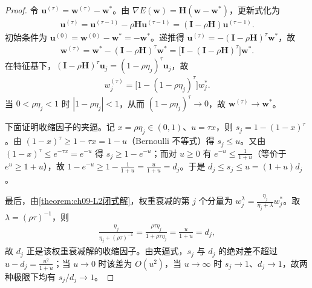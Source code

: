 \documentclass[../../main.tex]{subfiles}
\begin{document}
\begin{proof}
令 $\boldsymbol{u}^{(\tau)}=\boldsymbol{w}^{(\tau)}-\boldsymbol{w}^{*}$。由 $\nabla E(\boldsymbol{w})=\boldsymbol{H}(\boldsymbol{w}-\boldsymbol{w}^{*})$，更新式化为
\begin{align*}
\boldsymbol{u}^{(\tau)}=\boldsymbol{u}^{(\tau-1)}-\rho\boldsymbol{H}\boldsymbol{u}^{(\tau-1)}=(\boldsymbol{I}-\rho\boldsymbol{H})\boldsymbol{u}^{(\tau-1)}.
\end{align*}
初始条件为 $\boldsymbol{u}^{(0)}=\boldsymbol{w}^{(0)}-\boldsymbol{w}^{*}=-\boldsymbol{w}^{*}$。递推得 $\boldsymbol{u}^{(\tau)}=-(\boldsymbol{I}-\rho\boldsymbol{H})^{\tau}\boldsymbol{w}^{*}$，故
\begin{align*}
\boldsymbol{w}^{(\tau)}=\boldsymbol{w}^{*}-(\boldsymbol{I}-\rho\boldsymbol{H})^{\tau}\boldsymbol{w}^{*}=\bigl[\boldsymbol{I}-(\boldsymbol{I}-\rho\boldsymbol{H})^{\tau}\bigr]\boldsymbol{w}^{*}.
\end{align*}
在特征基下，$(\boldsymbol{I}-\rho\boldsymbol{H})^{\tau}\boldsymbol{u}_{j}=(1-\rho\eta_{j})^{\tau}\boldsymbol{u}_{j}$，故
\begin{align*}
w_{j}^{(\tau)}=\bigl[1-(1-\rho\eta_{j})^{\tau}\bigr]w_{j}^{*}.
\end{align*}
当 $0<\rho\eta_{j}<1$ 时 $|1-\rho\eta_{j}|<1$，从而 $(1-\rho\eta_{j})^{\tau}\to0$，故 $\boldsymbol{w}^{(\tau)}\to\boldsymbol{w}^{*}$。

下面证明收缩因子的夹逼。记 $x=\rho\eta_{j}\in(0,1)$、$u=\tau x$，则 $s_{j}=1-(1-x)^{\tau}$。由 $(1-x)^{\tau}\geqslant1-\tau x=1-u$（Bernoulli 不等式）得 $s_{j}\leqslant u$。又由 $(1-x)^{\tau}\leqslant e^{-\tau x}=e^{-u}$ 得 $s_{j}\geqslant1-e^{-u}$；而对 $u\geqslant0$ 有 $e^{-u}\leqslant\frac{1}{1+u}$（等价于 $e^{u}\geqslant1+u$），故 $1-e^{-u}\geqslant1-\frac{1}{1+u}=\frac{u}{1+u}=d_{j}$。于是 $d_{j}\leqslant s_{j}\leqslant u=(1+u)d_{j}$。

最后，由\cref{theorem:ch09-L2闭式解}，权重衰减的第 $j$ 个分量为 $w_{j}^{\lambda}=\frac{\eta_{j}}{\eta_{j}+\lambda}w_{j}^{*}$。取 $\lambda=(\rho\tau)^{-1}$，则
\begin{align*}
\frac{\eta_{j}}{\eta_{j}+(\rho\tau)^{-1}}=\frac{\rho\tau\eta_{j}}{1+\rho\tau\eta_{j}}=\frac{u}{1+u}=d_{j},
\end{align*}
故 $d_{j}$ 正是该权重衰减解的收缩因子。由夹逼式，$s_{j}$ 与 $d_{j}$ 的绝对差不超过 $u-d_{j}=\frac{u^{2}}{1+u}$；当 $u\to0$ 时该差为 $O(u^{2})$，当 $u\to\infty$ 时 $s_{j}\to1$、$d_{j}\to1$，故两种极限下均有 $s_{j}/d_{j}\to1$。
\end{proof}
\end{document}
